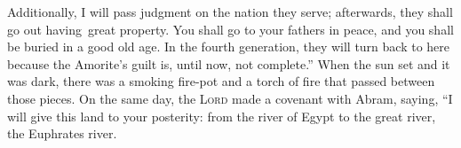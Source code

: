 \begin{inparaenum}
     Additionally, I will pass judgment on the nation they serve; afterwards, they shall go out having\understood\ great property.%
     You shall go to your fathers in peace, and you shall be buried in a good old age.%
     In the fourth generation, they will turn back to here because the Amorite's guilt is, until now, not complete.''%
     When the sun set and it was dark, there was a smoking fire-pot and a torch of fire that passed between those pieces.%
     On the same day, the \textsc{Lord} made a covenant with Abram, saying, ``I will give this land to your posterity: from the river of Egypt to the great river, the Euphrates river.%
\end{inparaenum}
